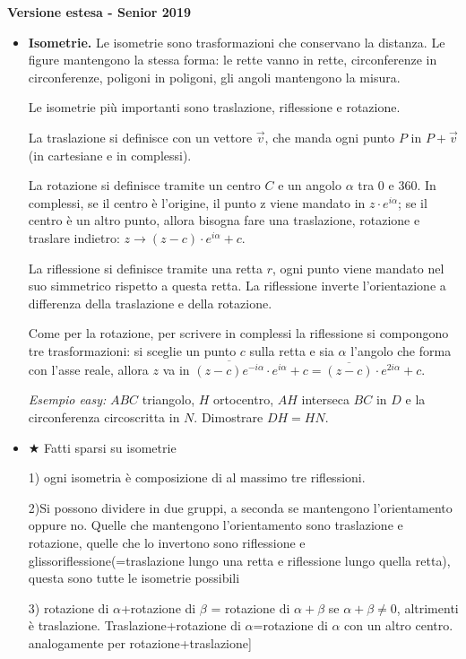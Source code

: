 \vspace{0.3cm}
\large{\textbf{Versione estesa - Senior 2019}}\normalsize
\begin{itemize}

\item \textbf{Isometrie. }Le isometrie sono trasformazioni che conservano la distanza. Le figure mantengono la stessa forma: le rette vanno in rette, circonferenze in circonferenze, poligoni in poligoni, gli angoli mantengono la misura. 

Le isometrie più importanti sono traslazione, riflessione e rotazione. 

La traslazione si definisce con un vettore $\vec{v}$, che manda ogni punto $P$ in $P+\vec{v}$ (in cartesiane e in complessi).

La rotazione si definisce tramite un centro $C$ e un angolo $\alpha$ tra 0 e 360.  In complessi, se il centro è l'origine, il punto z viene mandato in $z\cdot e^{i\alpha}$; se il centro è un altro punto, allora bisogna fare una traslazione, rotazione e traslare indietro: $z\rightarrow (z-c)\cdot e^{i\alpha}+c$.

La riflessione si definisce tramite una retta $r$, ogni punto viene mandato nel suo simmetrico rispetto a questa retta. La riflessione inverte l'orientazione a differenza della traslazione e della rotazione.

Come per la rotazione, per scrivere in complessi la riflessione si compongono tre trasformazioni: si sceglie un punto $c$ sulla retta e sia $\alpha$ l'angolo che forma con l'asse reale, allora $z$ va in $\overline{(z-c)e^{-i\alpha}}\cdot e^{i\alpha}+c=\overline{(z-c)}\cdot e^{2i\alpha}+c$.

\textit{Esempio easy:}  $ABC$ triangolo, $H$ ortocentro, $AH$ interseca $BC$ in $D$ e la circonferenza circoscritta in $N$. Dimostrare $DH=HN$.

\vspace{0.3cm}
\item $\bigstar$ Fatti sparsi su isometrie 

1) ogni isometria è composizione di al massimo tre riflessioni.

2)Si possono dividere in due gruppi, a seconda se mantengono l'orientamento oppure no. Quelle che mantengono l'orientamento sono traslazione e rotazione, quelle che lo invertono sono riflessione e glissoriflessione(=traslazione lungo una retta e riflessione lungo quella retta), questa sono tutte le isometrie possibili

3) rotazione di $\alpha$+rotazione di $\beta$ = rotazione di $\alpha+\beta$ se $\alpha+\beta \neq 0$, altrimenti è traslazione. Traslazione+rotazione di $\alpha$=rotazione di $\alpha$ con un altro centro. analogamente per rotazione+traslazione]


\end{itemize}
